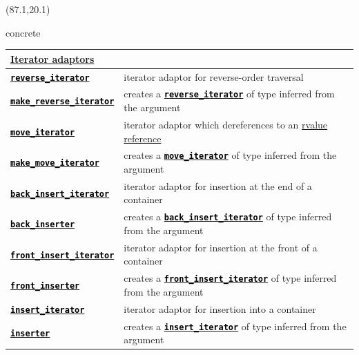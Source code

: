 \documentclass{beamer}
\newcommand\hcode[1]{\textcolor{black}{\texttt{\textbf{#1}}}}
\newcommand{\cppss}[1]{
  \ifstrequal{#1}{11}{\textcolor{blue}{\bf{\tiny{C++#1}}}}
    {\ifstrequal{#1}{14}{\textcolor{DarkGreen}{\bf{\tiny{C++#1}}}}
      {\ifstrequal{#1}{17}{\textcolor{DarkGreen}{\bf{\tiny{C++#1}}}}
        {\ifstrequal{#1}{20}{\textcolor{DarkRed}{\bf{\tiny{C++#1}}}}
          {\textcolor{DarkRed}{\bf{\tiny{#1}}}}}}}}
\newcommand\htblt[1]{\textcolor{purpleth}{\textbf{\Large{#1}}}}
\begin{document}
\begin{textblock}{30.4}(87.1,20.1)
  \begin{beamercolorbox}[sep=2mm,wd=30.9cm,rounded=true]{concrete}
    \begin{tabular*}{\linewidth}{l  l}
      \multicolumn{2}{l}{\htblt{\href{http://en.cppreference.com/w/cpp/iterator}{Iterator adaptors}}} \\ \hline
      \href{http://en.cppreference.com/w/cpp/iterator/reverse_iterator}{\hcode{reverse\_iterator}} & iterator adaptor for reverse-order traversal \\
      \rowcolor{white}
      \href{http://en.cppreference.com/w/cpp/iterator/make_reverse_iterator}{\hcode{make\_reverse\_iterator}} \cppss{14} & creates a \href{http://en.cppreference.com/w/cpp/iterator/reverse_iterator}{\hcode{reverse\_iterator}} of type inferred from the argument \\
      \href{http://en.cppreference.com/w/cpp/iterator/move_iterator}{\hcode{move\_iterator}} \cppss{11} & iterator adaptor which dereferences to an \href{http://en.cppreference.com/w/cpp/language/reference}{rvalue reference} \\
      \rowcolor{white}
      \href{http://en.cppreference.com/w/cpp/iterator/make_move_iterator}{\hcode{make\_move\_iterator}} \cppss{11} & creates a \href{http://en.cppreference.com/w/cpp/iterator/move_iterator}{\hcode{move\_iterator}} of type inferred from the argument \\
      \href{http://en.cppreference.com/w/cpp/iterator/back_insert_iterator}{\hcode{back\_insert\_iterator}} & iterator adaptor for insertion at the end of a container \\
      \rowcolor{white}
      \href{http://en.cppreference.com/w/cpp/iterator/back_inserter}{\hcode{back\_inserter}} & creates a \href{http://en.cppreference.com/w/cpp/iterator/back_insert_iterator}{\hcode{back\_insert\_iterator}} of type inferred from the argument \\
      \href{http://en.cppreference.com/w/cpp/iterator/front_insert_iterator}{\hcode{front\_insert\_iterator}} & iterator adaptor for insertion at the front of a container \\
      \rowcolor{white}
      \href{http://en.cppreference.com/w/cpp/iterator/front_inserter}{\hcode{front\_inserter}} & creates a \href{http://en.cppreference.com/w/cpp/iterator/front_insert_iterator}{\hcode{front\_insert\_iterator}} of type inferred from the argument \\
      \href{http://en.cppreference.com/w/cpp/iterator/insert_iterator}{\hcode{insert\_iterator}} & iterator adaptor for insertion into a container \\
      \rowcolor{white}
      \href{http://en.cppreference.com/w/cpp/iterator/inserter}{\hcode{inserter}} & creates a \href{http://en.cppreference.com/w/cpp/iterator/insert_iterator}{\hcode{insert\_iterator}} of type inferred from the argument \\
    \end{tabular*}
    \end{beamercolorbox}
\end{textblock}
\end{document}
